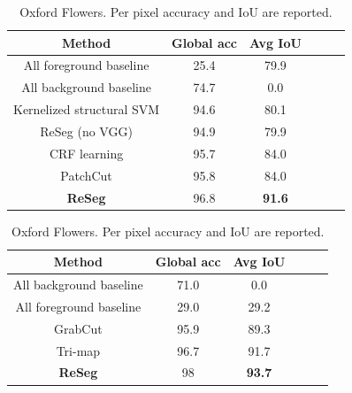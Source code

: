 \begin{table}[!ht]
    \begin{minipage}{0.45\textwidth}
        \centering
        \small{%
            \begin{tabular}{c|c|c||c|c|c}
                \multicolumn{1}{c}{Method} & \multicolumn{1}{c}{Global acc} & \multicolumn{1}{c}{\textbf{Avg IoU}}\\ \hline \hline

                All foreground baseline & 25.4 & 79.9 \\ \hline
                All background baseline & 74.7 & 0.0 \\ \hline
                Kernelized structural SVM \cite{bertelli2011kernelized} & 94.6 & 80.1 \\ \hline
                ReSeg (no VGG) & 94.9 & 79.9 \\ \hline
                CRF learning \cite{liu2015crf} & 95.7 & 84.0 \\ \hline
                PatchCut \cite{yang2015patchcut} & 95.8 & 84.0 \\ \hline
                \textbf{ReSeg} & 96.8 & \textbf{91.6} \\ \hline

            \end{tabular}
            \vspace*{0.1cm}
        }
        \caption{Weizmann Horses. Per pixel accuracy and IoU are
            reported.}
        \label{tbl:WeizmannHorses_SOTA}
    \end{minipage}
    \quad
    \begin{minipage}{0.45\textwidth}
        \centering
        \small{%
            \begin{tabular}{c|c|c||c|c|c}
                \multicolumn{1}{c}{Method} & \multicolumn{1}{c}{Global acc} & \multicolumn{1}{c}{\textbf{Avg IoU}}\\ \hline \hline

                All background baseline & 71.0 & 0.0 \\ \hline
                All foreground baseline & 29.0 & 29.2 \\ \hline
                GrabCut \cite{rother2004grabcut} & 95.9 & 89.3 \\ \hline
                Tri-map \cite{Xiaomeng14} & 96.7 & 91.7 \\ \hline
                \textbf{ReSeg} & 98 & \textbf{93.7} \\ \hline

            \end{tabular}
            \vspace*{0.1cm}
        }
        \caption{Oxford Flowers. Per pixel accuracy and IoU are
            reported.}
        \label{tbl:OxfordFlowers_SOTA}
    \end{minipage}
\end{table}

